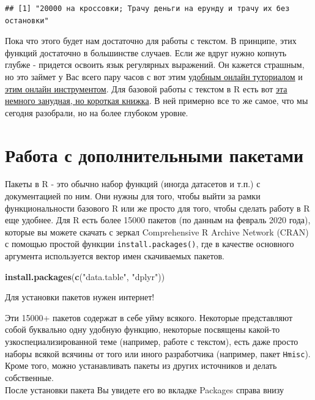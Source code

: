 \documentclass[]{book}
\newenvironment{Shaded}{\begin{snugshade}}{\end{snugshade}}
\newcommand{\KeywordTok}[1]{\textcolor[rgb]{0.13,0.29,0.53}{\textbf{#1}}}
\newcommand{\StringTok}[1]{\textcolor[rgb]{0.31,0.60,0.02}{#1}}
\newcommand{\NormalTok}[1]{#1}
\begin{document}
\begin{verbatim}
## [1] "20000 на кроссовки; Трачу деньги на ерунду и трачу их без остановки"
\end{verbatim}

Пока что этого будет нам достаточно для работы с текстом. В принципе,
этих функций достаточно в большинстве случаев. Если же вдруг нужно
копнуть глубже - придется освоить язык регулярных выражений. Он кажется
страшным, но это займет у Вас всего пару часов с вот этим
\href{https://regexone.com/}{удобным онлайн туториалом} и
\href{https://regex101.com/}{этим онлайн инструментом}. Для базовой
работы с текстом в R есть вот
\href{http://gastonsanchez.com/Handling_and_Processing_Strings_in_R.pdf}{эта
немного занудная, но короткая книжка}. В ней примерно все то же самое,
что мы сегодня разобрали, но на более глубоком уровне.

\section{Работа с дополнительными пакетами}\label{new_pack}

Пакеты в R - это обычно набор функций (иногда датасетов и т.п.) с
документацией по ним. Они нужны для того, чтобы выйти за рамки
функциональности базового R или же просто для того, чтобы сделать работу
в R еще удобнее. Для R есть более 15000 пакетов (по данным на февраль
2020 года), которые вы можете скачать с зеркал Comprehensive R Archive
Network (CRAN) с помощью простой функции \texttt{install.packages()},
где в качестве основного аргумента используется вектор имен скачиваемых
пакетов.

\begin{Shaded}
\begin{Highlighting}[]
\KeywordTok{install.packages}\NormalTok{(}\KeywordTok{c}\NormalTok{(}\StringTok{"data.table"}\NormalTok{, }\StringTok{"dplyr"}\NormalTok{))}
\end{Highlighting}
\end{Shaded}

Для установки пакетов нужен интернет!

Эти 15000+ пакетов содержат в себе уйму всякого. Некоторые представляют
собой буквально одну удобную функцию, некоторые посвящены какой-то
узкоспециализированной теме (например, работе с текстом), есть даже
просто наборы всякой всячины от того или иного разработчика (например,
пакет \texttt{Hmisc}). Кроме того, можно устанавливать пакеты из других
источников и делать собственные.\\
После установки пакета Вы увидете его во вкладке Packages справа внизу
\end{document}
